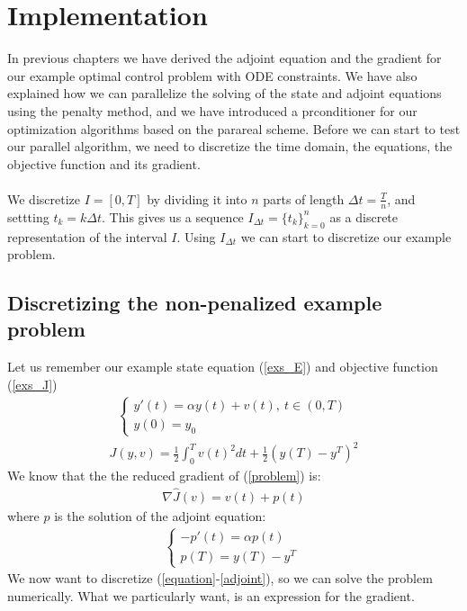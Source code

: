 \chapter{Implementation}
In previous chapters we have derived the adjoint equation and the gradient for our example optimal control problem with ODE constraints. We have also explained how we can parallelize the solving of the state and adjoint equations using the penalty method, and we have introduced a prconditioner for our optimization algorithms based on the parareal scheme. Before we can start to test our parallel algorithm, we need to discretize the time domain, the equations, the objective function and its gradient. 
\\
\\
We discretize $I=[0,T]$ by dividing it into $n$ parts of length $\Delta t=\frac{T}{n}$, and settting $t_k=k\Delta t$. This gives us a sequence $I_{\Delta t}=\{t_k\}_{k=0}^{n}$ as a discrete representation of the interval $I$. Using $I_{\Delta t}$ we can start to discretize our example problem.
\section{Discretizing the non-penalized example problem}
Let us remember our example state equation (\ref{exs_E}) and objective function (\ref{exs_J}) 
\begin{align}
\left\{
     \begin{array}{lr}
       	y'(t)=\alpha y(t) +v(t), \ t \in (0,T)\\
       	   y(0)=y_0
     \end{array}
   \right. \label{equation}
\end{align}
\begin{align}
J(y,v) = \frac{1}{2}\int_0^Tv(t)^2dt + \frac{1}{2}(y(T)-y^T)^2
\label{problem}
\end{align}
We know that the the reduced gradient of (\ref{problem}) is:
\begin{align}
\nabla\hat{J}(v) = v(t)+p(t) \label{gradiant}
\end{align}
where $p$ is the solution of the adjoint equation:
\begin{align}   
  \left\{
     \begin{array}{lr}
	-p'(t) = \alpha p(t) \\
	p(T) = y(T)-y^T     \
	\end{array}
   \right. \label{adjoint}
\end{align}
We now want to discretize (\ref{equation}-\ref{adjoint}), so we can solve the problem numerically. What we particularly want, is an expression for the gradient. 
